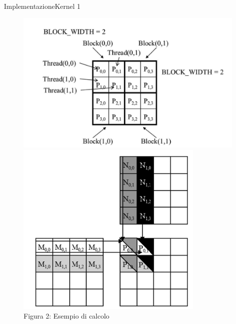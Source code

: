 \documentclass{beamer}
\begin{document}
\begin{frame}{Implementazione}{Kernel 1}
    \begin{figure}[H]
        \centering
        \begin{minipage}{0.48\textwidth}
            \centering
            \includegraphics[width=\linewidth]{imgs/matrix_division.png}
            \caption{Figura 1: Divisione degli elementi in una griglia 2x2 con blocchi 2x2}
        \end{minipage}
        \hfill
        \begin{minipage}{0.48\textwidth}
            \centering
            \includegraphics[width=\linewidth]{imgs/execution1.png}
            \caption{Figura 2: Esempio di calcolo}
        \end{minipage}
    \end{figure}
\end{frame}
\end{document}
